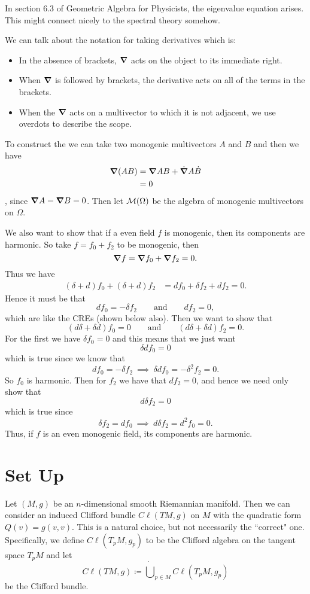 In section 6.3 of Geometric Algebra for Physicists, the eigenvalue equation arises. This might connect nicely to the spectral theory somehow.

We can talk about the notation for taking derivatives which is:
\begin{itemize}
    \item In the absence of brackets, $\boldsymbol{\nabla}$ acts on the object to its immediate right.
    \item When $\boldsymbol{\nabla}$ is followed by brackets, the derivative acts on all of the terms in the brackets.
    \item When the $\boldsymbol{\nabla}$ acts on a multivector to which it is not adjacent, we use overdots to describe the scope.
\end{itemize}
To construct the  we can take two monogenic multivectors $A$ and $B$ and then we have
\begin{align*}
\boldsymbol{\nabla} (AB) &= \boldsymbol{\nabla} AB + \dot{\boldsymbol{\nabla}}A\dot{B}\\
&= 0
\end{align*},
since $\boldsymbol{\nabla} A=\boldsymbol{\nabla} B=0$. Then let $\mathcal{M}(\Omega)$ be the algebra of monogenic multivectors on $\Omega$.

We also want to show that if a even field $f$ is monogenic, then its components are harmonic. So take $f=f_0+f_2$ to be monogenic, then
\[
\boldsymbol{\nabla} f = \boldsymbol{\nabla} f_0 + \boldsymbol{\nabla} f_2 = 0.
\]
Thus we have
\begin{align*}
    (\delta + d)f_0 + (\delta+d)f_2&= df_0 + \delta f_2 + df_2 = 0. 
\end{align*}
Hence it must be that 
\[
df_0 = - \delta f_2 \qquad \textrm{and} \qquad df_2 = 0,
\]
which are like the CREs (shown below also).  Then we want to show that
\[
(d\delta +\delta d)f_0 = 0 \qquad \textrm{and} \qquad (d\delta + \delta d) f_2 = 0.
\]
For the first we have $\delta f_0=0$ and this means that we just want
\[
\delta d f_0 =0 
\]
which is true since we know that 
\[
df_0 = -\delta f_2 ~\implies~ \delta df_0 = -\delta^2 f_2 = 0.
\]
So $f_0$ is harmonic.  Then for $f_2$ we have that $df_2=0$, and hence we need only show that
\[
d\delta f_2 =0
\]
which is true since
\[
\delta f_2 = df_0 ~\implies~ d\delta f_2 = d^2 f_0 = 0.
\]
Thus, if $f$ is an even monogenic field, its components are harmonic.



\section{Set Up}
Let $(M,g)$ be an $n$-dimensional smooth Riemannian manifold.  Then we can consider an induced Clifford bundle $C\ell(TM,g)$ on $M$ with the quadratic form $Q(v)=g(v,v)$.  This is a natural choice, but not necessarily the ``correct" one.  Specifically, we define $C\ell(T_pM,g_p)$ to be the Clifford algebra on the tangent space $T_pM$ and let
\[
C\ell(TM,g) \coloneqq \dot{\bigcup}_{p\in M} C\ell (T_pM,g_p)
\]
be the Clifford bundle.

